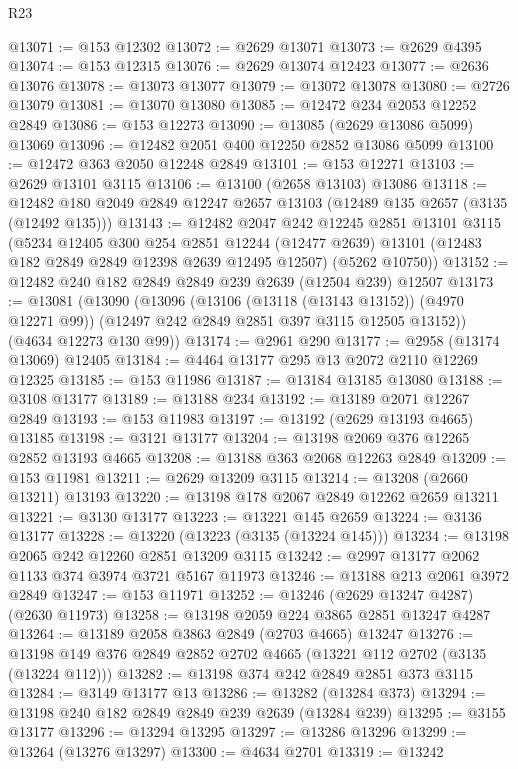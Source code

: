 \begin{lexlean}{R23}
\begin{coremodule}
@13071 := @153 @12302
@13072 := @2629 @13071
@13073 := @2629 @4395
@13074 := @153 @12315
@13076 := @2629 @13074 @12423
@13077 := @2636 @13076
@13078 := @13073 @13077
@13079 := @13072 @13078
@13080 := @2726 @13079
@13081 := @13070 @13080
@13085 := @12472 @234 @2053 @12252 @2849
@13086 := @153 @12273
@13090 := @13085 (@2629 @13086 @5099) @13069
@13096 := @12482 @2051 @400 @12250 @2852 @13086 @5099
@13100 := @12472 @363 @2050 @12248 @2849
@13101 := @153 @12271
@13103 := @2629 @13101 @3115
@13106 := @13100 (@2658 @13103) @13086
@13118 := @12482 @180 @2049 @2849 @12247 @2657 @13103 (@12489 @135 @2657 (@3135 (@12492 @135)))
@13143 := @12482
    @2047
    @242
    @12245
    @2851
    @13101
    @3115
    (@5234
      @12405
      @300
      @254
      @2851
      @12244
      (@12477 @2639)
      @13101
      (@12483 @182 @2849 @2849 @12398 @2639 @12495 @12507)
      (@5262 @10750))
@13152 := @12482 @240 @182 @2849 @2849 @239 @2639 (@12504 @239) @12507
@13173 := @13081
    (@13090
      (@13096
        (@13106 (@13118 (@13143 @13152)) (@4970 @12271 @99))
        (@12497 @242 @2849 @2851 @397 @3115 @12505 @13152))
      (@4634 @12273 @130 @99))
@13174 := @2961 @290
@13177 := @2958 (@13174 @13069) @12405
@13184 := @4464 @13177 @295 @13 @2072 @2110 @12269 @12325
@13185 := @153 @11986
@13187 := @13184 @13185 @13080
@13188 := @3108 @13177
@13189 := @13188 @234
@13192 := @13189 @2071 @12267 @2849
@13193 := @153 @11983
@13197 := @13192 (@2629 @13193 @4665) @13185
@13198 := @3121 @13177
@13204 := @13198 @2069 @376 @12265 @2852 @13193 @4665
@13208 := @13188 @363 @2068 @12263 @2849
@13209 := @153 @11981
@13211 := @2629 @13209 @3115
@13214 := @13208 (@2660 @13211) @13193
@13220 := @13198 @178 @2067 @2849 @12262 @2659 @13211
@13221 := @3130 @13177
@13223 := @13221 @145 @2659
@13224 := @3136 @13177
@13228 := @13220 (@13223 (@3135 (@13224 @145)))
@13234 := @13198 @2065 @242 @12260 @2851 @13209 @3115
@13242 := @2997 @13177 @2062 @1133 @374 @3974 @3721 @5167 @11973
@13246 := @13188 @213 @2061 @3972 @2849
@13247 := @153 @11971
@13252 := @13246 (@2629 @13247 @4287) (@2630 @11973)
@13258 := @13198 @2059 @224 @3865 @2851 @13247 @4287
@13264 := @13189 @2058 @3863 @2849 (@2703 @4665) @13247
@13276 := @13198 @149 @376 @2849 @2852 @2702 @4665 (@13221 @112 @2702 (@3135 (@13224 @112)))
@13282 := @13198 @374 @242 @2849 @2851 @373 @3115
@13284 := @3149 @13177 @13
@13286 := @13282 (@13284 @373)
@13294 := @13198 @240 @182 @2849 @2849 @239 @2639 (@13284 @239)
@13295 := @3155 @13177
@13296 := @13294 @13295
@13297 := @13286 @13296
@13299 := @13264 (@13276 @13297)
@13300 := @4634 @2701
@13319 := @13242

\end{coremodule}
\end{lexlean}

